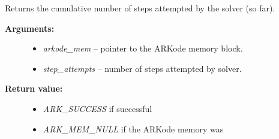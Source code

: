 \documentclass[letterpaper,10pt,english]{sphinxmanual}
\begin{document}
\begin{fulllineitems}
\label{c_interface/User_callable:ARKodeGetNumStepAttempts}
Returns the cumulative number of steps attempted by the solver (so far).
\begin{description}
\item[{\textbf{Arguments:}}] \leavevmode\begin{itemize}
\item {} 
\emph{arkode\_mem} -- pointer to the ARKode memory block.

\item {} 
\emph{step\_attempts} -- number of steps attempted by solver.

\end{itemize}

\item[{\textbf{Return value:}}] \leavevmode\begin{itemize}
\item {} 
\emph{ARK\_SUCCESS} if successful

\item {} 
\emph{ARK\_MEM\_NULL} if the ARKode memory was 

\end{itemize}

\end{description}

\end{fulllineitems}

\end{document}
